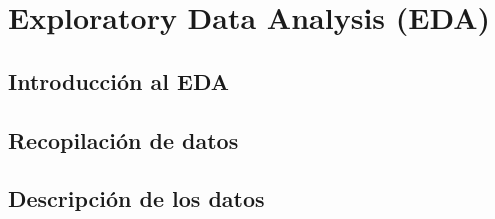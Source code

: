 \documentclass[letterpaper, 12pt]{report}
\begin{document}
\chapter{Exploratory Data Analysis (EDA)}



\section{Introducción al EDA}


\section{Recopilación de datos}


\section{Descripción de los datos}


% 

%

%

%

\begin{doublespace}
  
  
\end{doublespace}
\end{document}
